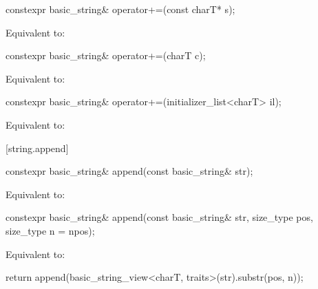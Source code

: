 %
\begin{itemdecl}
constexpr basic_string& operator+=(const charT* s);
\end{itemdecl}

\begin{itemdescr}
\pnum
\effects
Equivalent to: 
\end{itemdescr}

%
\begin{itemdecl}
constexpr basic_string& operator+=(charT c);
\end{itemdecl}

\begin{itemdescr}
\pnum
\effects
Equivalent to: 
\end{itemdescr}

%
\begin{itemdecl}
constexpr basic_string& operator+=(initializer_list<charT> il);
\end{itemdecl}

\begin{itemdescr}
\pnum
\effects
Equivalent to: 
\end{itemdescr}


[string.append]{}

%
\begin{itemdecl}
constexpr basic_string& append(const basic_string& str);
\end{itemdecl}

\begin{itemdescr}
\pnum
\effects
Equivalent to: 
\end{itemdescr}

%
\begin{itemdecl}
constexpr basic_string& append(const basic_string& str, size_type pos, size_type n = npos);
\end{itemdecl}

\begin{itemdescr}
\pnum
\effects
Equivalent to:
\begin{codeblock}
return append(basic_string_view<charT, traits>(str).substr(pos, n));
\end{codeblock}
\end{itemdescr}

